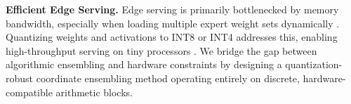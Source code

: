 \textbf{Efficient Edge Serving.} Edge serving is primarily bottlenecked by memory bandwidth, especially when loading multiple expert weight sets dynamically \cite{sheng2023high, kwon2023efficient}. Quantizing weights and activations to INT8 or INT4 addresses this, enabling high-throughput serving on tiny processors \cite{howard2017mobilenets, dettmers2022gpt3, xiao2023smoothquant, dettmers2024qlora}. We bridge the gap between algorithmic ensembling and hardware constraints by designing a quantization-robust coordinate ensembling method operating entirely on discrete, hardware-compatible arithmetic blocks.

